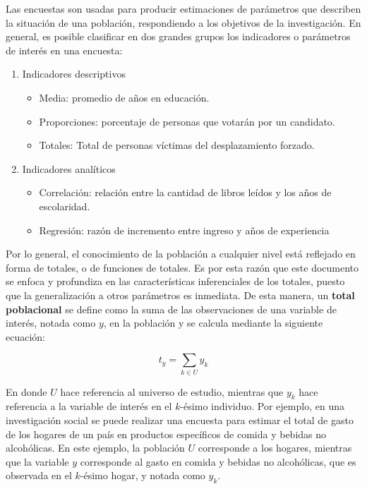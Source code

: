 \documentclass[
  10pt,
  spanish,
]{book}
\providecommand{\tightlist}{%
  \setlength{\itemsep}{0pt}\setlength{\parskip}{0pt}}
\begin{document}
Las encuestas son usadas para producir estimaciones de parámetros que describen la situación de una población, respondiendo a los objetivos de la investigación. En general, es posible clasificar en dos grandes grupos los indicadores o parámetros de interés en una encuesta:

\begin{enumerate}
\def\labelenumi{\arabic{enumi}.}
\tightlist
\item
  Indicadores descriptivos

  \begin{itemize}
  \tightlist
  \item
    Media: promedio de años en educación.
  \item
    Proporciones: porcentaje de personas que votarán por un candidato.
  \item
    Totales: Total de personas víctimas del desplazamiento forzado.
  \end{itemize}
\item
  Indicadores analíticos

  \begin{itemize}
  \tightlist
  \item
    Correlación: relación entre la cantidad de libros leídos y los años de escolaridad.
  \item
    Regresión: razón de incremento entre ingreso y años de experiencia
  \end{itemize}
\end{enumerate}

Por lo general, el conocimiento de la población a cualquier nivel está reflejado en forma de totales, o de funciones de totales. Es por esta razón que este documento se enfoca y profundiza en las características inferenciales de los totales, puesto que la generalización a otros parámetros es inmediata. De esta manera, un \textbf{total poblacional} se define como la suma de las observaciones de una variable de interés, notada como \(y\), en la población y se calcula mediante la siguiente ecuación:

\[t_y = \sum_{k \in U} y_k\]

En donde \(U\) hace referencia al universo de estudio, mientras que \(y_k\) hace referencia a la variable de interés en el \(k\)-ésimo individuo. Por ejemplo, en una investigación social se puede realizar una encuesta para estimar el total de gasto de los hogares de un país en productos específicos de comida y bebidas no alcohólicas. En este ejemplo, la población \(U\) corresponde a los hogares, mientras que la variable \(y\) corresponde al gasto en comida y bebidas no alcohólicas, que es observada en el \(k\)-ésimo hogar, y notada como \(y_k\).
\end{document}
